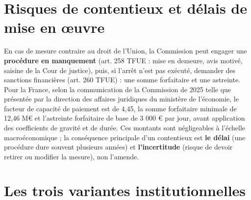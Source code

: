 \documentclass[
  11pt,
  11pt,
  a4paper,
  openany]{book}
\begin{document}
\hypertarget{sec:contentieux}{%
\section{Risques de contentieux et délais de mise en
œuvre}\label{sec:contentieux}}

En cas de mesure contraire au droit de l'Union, la Commission peut
engager une \textbf{procédure en manquement} (art. 258 TFUE : mise en
demeure, avis motivé, saisine de la Cour de justice), puis, si l'arrêt
n'est pas exécuté, demander des sanctions financières (art. 260 TFUE) :
une somme forfaitaire et une astreinte. Pour la France, selon la
communication de la Commission de 2025 telle que présentée par la
direction des affaires juridiques du ministère de l'économie, le facteur
de capacité de paiement est de 4,45, la somme forfaitaire minimale de
12,46 M€ et l'astreinte forfaitaire de base de 3 000 € par jour, avant
application des coefficients de gravité et de durée. Ces montants sont
négligeables à l'échelle macroéconomique ; la conséquence principale
d'un contentieux est \textbf{le délai} (une procédure dure souvent
plusieurs années) et \textbf{l'incertitude} (risque de devoir retirer ou
modifier la mesure), non l'amende.

\hypertarget{sec:variantes-ue}{%
\section{Les trois variantes institutionnelles}\label{sec:variantes-ue}}
\end{document}
